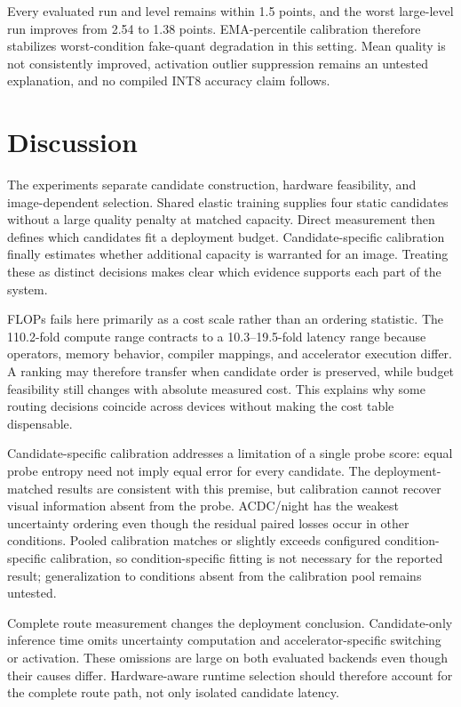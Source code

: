 \documentclass[a4paper,review,12pt]{elsarticle}
\begin{document}
Every evaluated run and level remains within 1.5 points, and the worst large-level run improves from 2.54 to 1.38 points. EMA-percentile calibration therefore stabilizes worst-condition fake-quant degradation in this setting. Mean quality is not consistently improved, activation outlier suppression remains an untested explanation, and no compiled INT8 accuracy claim follows.

\section{Discussion}
\label{sec:discussion}

The experiments separate candidate construction, hardware feasibility, and image-dependent selection. Shared elastic training supplies four static candidates without a large quality penalty at matched capacity. Direct measurement then defines which candidates fit a deployment budget. Candidate-specific calibration finally estimates whether additional capacity is warranted for an image. Treating these as distinct decisions makes clear which evidence supports each part of the system.

FLOPs fails here primarily as a cost scale rather than an ordering statistic. The 110.2-fold compute range contracts to a 10.3--19.5-fold latency range because operators, memory behavior, compiler mappings, and accelerator execution differ. A ranking may therefore transfer when candidate order is preserved, while budget feasibility still changes with absolute measured cost. This explains why some routing decisions coincide across devices without making the cost table dispensable.

Candidate-specific calibration addresses a limitation of a single probe score: equal probe entropy need not imply equal error for every candidate. The deployment-matched results are consistent with this premise, but calibration cannot recover visual information absent from the probe. ACDC/night has the weakest uncertainty ordering even though the residual paired losses occur in other conditions. Pooled calibration matches or slightly exceeds configured condition-specific calibration, so condition-specific fitting is not necessary for the reported result; generalization to conditions absent from the calibration pool remains untested.

Complete route measurement changes the deployment conclusion. Candidate-only inference time omits uncertainty computation and accelerator-specific switching or activation. These omissions are large on both evaluated backends even though their causes differ. Hardware-aware runtime selection should therefore account for the complete route path, not only isolated candidate latency.
\end{document}
